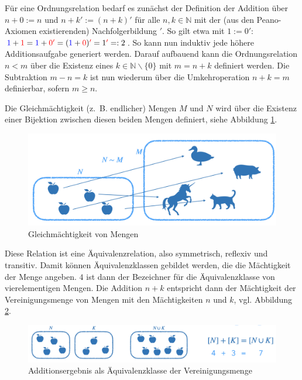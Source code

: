 \documentclass[
]{scrbook}
\theoremstyle{definition}
\theoremstyle{definition}
\theoremstyle{definition}
\theoremstyle{definition}
\theoremstyle{remark}
\begin{document}
Für eine Ordnungsrelation bedarf es zunächst der Definition der Addition über \(n+0 := n\) und \(n+k' := (n+k)'\) für alle \(n,k\in\mathbb{N}\) mit der (aus den Peano-Axiomen existierenden) Nachfolgerbildung \('\). So gilt etwa mit \(1:=0'\): \({\color{blue} 1}+{\color{red} 1} = {\color{blue} 1}+{\color{red} {0'}} = ({\color{blue} 1}+{\color{red} 0}){\color{red} '} = 1{\color{red} '} =: 2\). So kann nun induktiv jede höhere Additionsaufgabe generiert werden. Darauf aufbauend kann die Ordnungsrelation \(n<m\) über die Existenz eines \(k\in\mathbb{N}\backslash\{0\}\) mit \(m = n+k\) definiert werden. Die Subtraktion \(m-n = k\) ist nun wiederum über die Umkehroperation \(n+k = m\) definierbar, sofern \(m\geq n\).

Die Gleichmächtigkeit (z.~B. endlicher) Mengen \(M\) und \(N\) wird über die Existenz einer Bijektion zwischen diesen beiden Mengen definiert, siehe Abbildung \ref{fig:Bijektion}.

\begin{figure}

{\centering \includegraphics[width=0.75\linewidth]{pictures/2-Bijektion} 

}

\caption{Gleichmächtigkeit von Mengen}\label{fig:Bijektion}
\end{figure}

Diese Relation ist eine Äquivalenzrelation, also symmetrisch, reflexiv und transitiv. Damit können Äquivalenzklassen gebildet werden, die die Mächtigkeit der Menge angeben. \(4\) ist dann der Bezeichner für die Äquivalenzklasse von vierelementigen Mengen. Die Addition \(n+k\) entspricht dann der Mächtigkeit der Vereinigungsmenge von Mengen mit den Mächtigkeiten \(n\) und \(k\), vgl. Abbildung \ref{fig:Vereinigung}.

\begin{figure}

{\centering \includegraphics[width=0.9\linewidth]{pictures/2-Vereinigung} 

}

\caption{Additionsergebnis als Äquivalenzklasse der Vereinigungsmenge}\label{fig:Vereinigung}
\end{figure}
\end{document}
